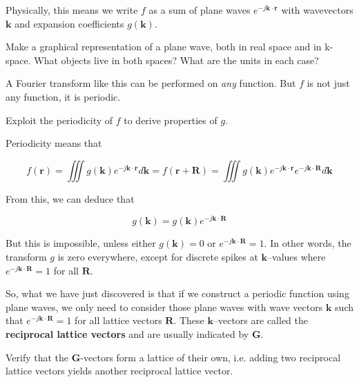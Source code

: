 Physically, this means we write $f$ as a sum of plane waves $e ^ {-j {\mathbf k} \cdot {\mathbf r}}$ with wavevectors ${\mathbf k}$ and expansion coefficients $g({\mathbf k})$.


\begin{exer}
Make a graphical representation of a plane wave, both in real space and in k-space. What objects live in both spaces? What are the units in each case?
\end{exer}

A Fourier transform like this can be performed on \emph{any} function. But $f$ is not just any function, it is periodic.

\begin{cue}
Exploit the periodicity of $f$ to derive properties of $g$. 
\end{cue}

Periodicity means that

\begin{equation}
f({\mathbf r}) = \iiint g({\mathbf k}) e ^ {-j {\mathbf k} \cdot {\mathbf r}} d{\mathbf k} = f({\mathbf r} + {\mathbf R}) = \iiint g({\mathbf k}) e ^ {-j {\mathbf k} \cdot {\mathbf r}} e ^ {-j {\mathbf k} \cdot {\mathbf R}} d{\mathbf k}
\end{equation} 

From this, we can deduce that

\begin{equation}
g({\mathbf k}) = g({\mathbf k}) e ^ {-j {\mathbf k} \cdot {\mathbf R}}
\end{equation} 

But this is impossible, unless either $g({\mathbf k}) = 0$ or $e ^ {-j {\mathbf k} \cdot {\mathbf R}} = 1$. In other words, the transform $g$ is zero everywhere, except for discrete spikes at ${\mathbf k}$--values where $e ^ {-j {\mathbf k} \cdot {\mathbf R}} = 1$ for all ${\mathbf R}$.

So, what we have just discovered is that if we construct a periodic function using plane waves, we only need to consider those plane waves with wave vectors ${\mathbf k}$ such that $e ^ {-j {\mathbf k} \cdot {\mathbf R}} = 1$ for all lattice vectors ${\mathbf R}$. These ${\mathbf k}$--vectors are called the \textbf{reciprocal lattice vectors} and are usually indicated by ${\mathbf G}$.

\begin{exer}
Verify that the  ${\mathbf G}$-vectors form a lattice of their own, i.e. adding two reciprocal lattice vectors yields another reciprocal lattice vector.
\end{exer}

